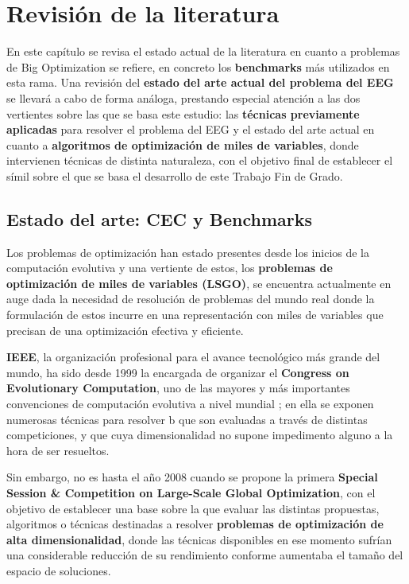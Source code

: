 \chapter{Revisión de la literatura}

En este capítulo se revisa el estado actual de la literatura en cuanto a problemas de Big Optimization se refiere, en concreto los \textbf{benchmarks} más utilizados en esta rama. Una revisión del \textbf{estado del arte actual del problema del EEG} se llevará a cabo de forma análoga, prestando especial atención a las dos vertientes sobre las que se basa este estudio: las \textbf{técnicas previamente aplicadas} para resolver el problema del EEG y el estado del arte actual en cuanto a \textbf{algoritmos de optimización de miles de variables}, donde intervienen técnicas de distinta naturaleza, con el objetivo final de establecer el símil sobre el que se basa el desarrollo de este Trabajo Fin de Grado. 

\section{Estado del arte: CEC y Benchmarks}

Los problemas de optimización  han estado presentes desde los inicios de la computación evolutiva y una vertiente de estos, los \textbf{problemas de optimización de miles de variables (LSGO)}, se encuentra actualmente en auge dada la necesidad de resolución de problemas del mundo real donde la formulación de estos incurre en una representación con miles de variables que precisan de una optimización efectiva y eficiente.

\textbf{IEEE}, la organización profesional para el avance tecnológico más grande del mundo, ha sido desde 1999 la encargada de organizar el \textbf{Congress on Evolutionary Computation}, uno de las mayores y más importantes convenciones de computación evolutiva a nivel mundial \cite{IEEECEC}; en ella se exponen numerosas técnicas para resolver b que son evaluadas a través de distintas competiciones, y que cuya dimensionalidad no supone impedimento alguno a la hora de ser resueltos.

Sin embargo, no es hasta el año 2008 cuando se propone la primera \textbf{Special Session \& Competition on Large-Scale Global Optimization}\cite{CEC-LSGO}, con el objetivo de establecer una base sobre la que evaluar las distintas propuestas, algoritmos o técnicas destinadas a resolver\textbf{ problemas de optimización de alta dimensionalidad}, donde las técnicas disponibles en ese momento sufrían una considerable reducción de su rendimiento conforme aumentaba el tamaño del espacio de soluciones.


